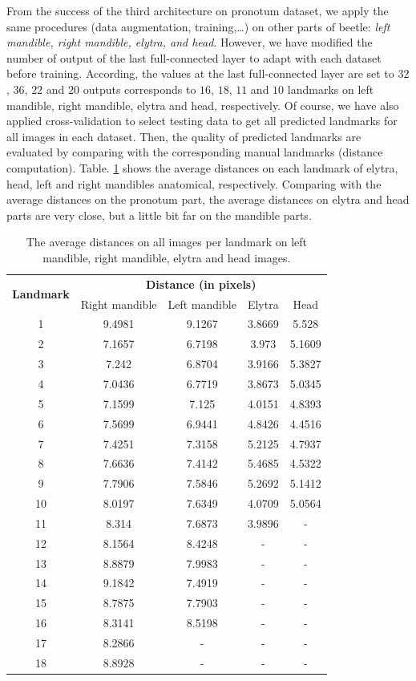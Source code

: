 \documentclass[review]{elsarticle}
\begin{document}
From the success of the third architecture on pronotum dataset, we apply the same procedures (data augmentation, training,\ldots) on other parts of beetle: \textit{left mandible, right mandible, elytra, and head}. However, we have modified the number of output of the last full-connected layer to adapt with each dataset before training. According, the values at the last full-connected layer are set to $32$, $36$, $22$ and $20$ outputs corresponds to $16$, $18$, $11$ and $10$ landmarks on left mandible, right mandible, elytra and head, respectively. Of course, we have also applied cross-validation to select testing data to get all predicted landmarks for all images in each dataset. Then, the quality of predicted landmarks are evaluated by comparing with the corresponding manual landmarks (distance computation). Table. \ref{tblavg4parts} shows the average distances on each landmark of elytra, head, left and right mandibles anatomical, respectively. Comparing with the average distances on the pronotum part, the average distances on elytra and head parts are very close, but a little bit far on the mandible parts.

\begin{table}[htbp]
	\centering	
	\begin{tabular}{|c|c|c|c|c|}
		\hline
		\multirow{2}{*}{\textbf{Landmark}} & \multicolumn{4}{|c|}{\textbf{Distance (in pixels)}} \\ \cline{2-5}
		 & Right mandible & Left mandible & Elytra & Head  \\ \hline
		1 & 9.4981 & 9.1267 & 3.8669 & 5.528  \\ \hline
2 & 7.1657 & 6.7198 & 3.973 & 5.1609  \\ \hline
3 & 7.242 & 6.8704 & 3.9166 & 5.3827 \\ \hline
4 & 7.0436 & 6.7719 & 3.8673 & 5.0345 \\ \hline
5 & 7.1599 & 7.125 & 4.0151 & 4.8393 \\ \hline
6 & 7.5699 & 6.9441 & 4.8426 & 4.4516 \\ \hline
7 & 7.4251 & 7.3158 & 5.2125 & 4.7937 \\ \hline
8 & 7.6636 & 7.4142 & 5.4685 & 4.5322 \\ \hline
9 & 7.7906 & 7.5846 & 5.2692 & 5.1412 \\ \hline
10 & 8.0197 & 7.6349 & 4.0709 & 5.0564 \\ \hline
11 & 8.314 & 7.6873 & 3.9896 & - \\ \hline
12 & 8.1564 & 8.4248 & - & - \\ \hline
13 & 8.8879 & 7.9983 & - & - \\ \hline
14 & 9.1842 & 7.4919 & - & - \\ \hline
15 & 8.7875 & 7.7903 & - & - \\ \hline
16 & 8.3141 & 8.5198 & - & - \\ \hline
17 & 8.2866 & - & - & - \\ \hline
18 & 8.8928 & - & - & - \\ \hline
	\end{tabular}
	\caption{The average distances on all images per landmark on left mandible, right mandible, elytra and head images.}
	\label{tblavg4parts}
\end{table}
\end{document}

